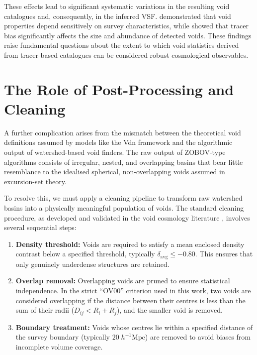 \documentclass[12pt]{report}
\begin{document}
These effects lead to significant systematic variations in the resulting void catalogues and, consequently, in the inferred VSF. \citet{Nadathur2015a} demonstrated that void properties depend sensitively on survey characteristics, while \citet{Contarini2019} showed that tracer bias significantly affects the size and abundance of detected voids. These findings raise fundamental questions about the extent to which void statistics derived from tracer-based catalogues can be considered robust cosmological observables.


\section{The Role of Post-Processing and Cleaning}

A further complication arises from the mismatch between the theoretical void definitions assumed by models like the Vdn framework and the algorithmic output of watershed-based void finders. The raw output of ZOBOV-type algorithms consists of irregular, nested, and overlapping basins that bear little resemblance to the idealised spherical, non-overlapping voids assumed in excursion-set theory.

To resolve this, we must apply a cleaning pipeline to transform raw watershed basins into a physically meaningful population of voids. The standard cleaning procedure, as developed and validated in the void cosmology literature \citep{Ronconi2017,Contarini2019,Contarini2023,Sartori2025}, involves several sequential steps:

\begin{enumerate}
    \item \textbf{Density threshold:} Voids are required to satisfy a mean enclosed density contrast below a specified threshold, typically $\delta_\mathrm{avg} \leq -0.80$. This ensures that only genuinely underdense structures are retained.

    \item \textbf{Overlap removal:} Overlapping voids are pruned to ensure statistical independence. In the strict ``OV00'' criterion used in this work, two voids are considered overlapping if the distance between their centres is less than the sum of their radii ($D_{ij} < R_i + R_j$), and the smaller void is removed.

    \item \textbf{Boundary treatment:} Voids whose centres lie within a specified distance of the survey boundary (typically $20\;h^{-1}\mathrm{Mpc}$) are removed to avoid biases from incomplete volume coverage.
\end{enumerate}
\end{document}
